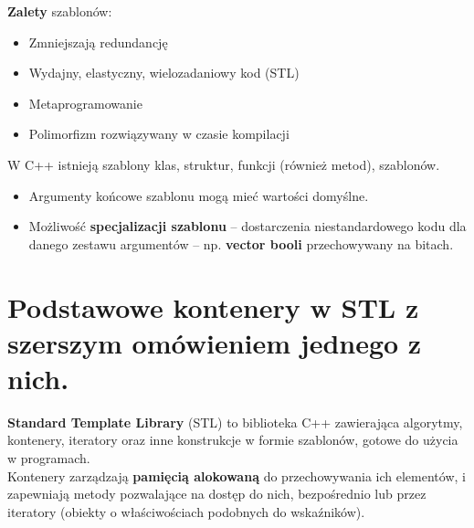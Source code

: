 \documentclass[main.tex]{subfiles}
\begin{document}
    \noindent \textbf{Zalety} szablonów:
    \begin{itemize}[noitemsep]
        \item Zmniejszają redundancję
        \item Wydajny, elastyczny, wielozadaniowy kod (STL)
        \item Metaprogramowanie
        \item Polimorfizm rozwiązywany w czasie kompilacji
    \end{itemize}

    \noindent    W C++ istnieją szablony klas, struktur, funkcji (również metod), szablonów.
    \begin{itemize}[noitemsep]
        \item Argumenty końcowe szablonu mogą mieć wartości domyślne.
        \item Możliwość \textbf{specjalizacji szablonu} -- dostarczenia niestandardowego kodu dla danego zestawu
        argumentów -- np. \textbf{vector booli} przechowywany na bitach.
    \end{itemize}


    \section{Podstawowe kontenery w STL z szerszym omówieniem jednego z nich.}
    \textbf{Standard Template Library} (STL) to biblioteka C++ zawierająca algorytmy, kontenery, iteratory oraz inne
    konstrukcje w formie szablonów, gotowe do użycia w programach.\\

    \noindent Kontenery zarządzają \textbf{pamięcią alokowaną} do przechowywania ich elementów, i zapewniają metody
    pozwalające na dostęp do nich, bezpośrednio lub przez iteratory (obiekty o właściwościach podobnych do wskaźników).\\
\end{document}
